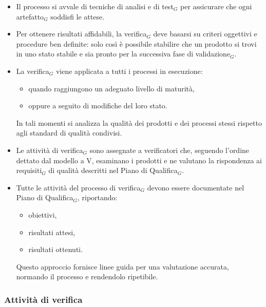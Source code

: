 \documentclass[a4paper, 10pt]{article}
\begin{document}
\begin{itemize}
    \item Il processo si avvale di tecniche di analisi e di test$_G$ per assicurare che ogni artefatto$_G$ soddisfi le attese.
    \item Per ottenere risultati affidabili, la verifica$_G$ deve basarsi su criteri oggettivi e procedure ben definite: solo così è possibile stabilire che un prodotto si trovi in uno stato stabile e sia pronto per la successiva fase di validazione$_G$.
    \item La verifica$_G$ viene applicata a tutti i processi in esecuzione:
    \begin{itemize}
        \item quando raggiungono un adeguato livello di maturità,
        \item oppure a seguito di modifiche del loro stato.
    \end{itemize}
    In tali momenti si analizza la qualità dei prodotti e dei processi stessi rispetto agli standard di qualità condivisi.
    \item Le attività di verifica$_G$ sono assegnate a verificatori che, seguendo l'ordine dettato dal modello a V, esaminano i prodotti e ne valutano la rispondenza ai requisiti$_G$ di qualità descritti nel Piano di Qualifica$_G$.
    \item Tutte le attività del processo di verifica$_G$ devono essere documentate nel Piano di Qualifica$_G$, riportando:
    \begin{itemize}
        \item obiettivi,
        \item risultati attesi,
        \item risultati ottenuti.
    \end{itemize}
    Questo approccio fornisce linee guida per una valutazione accurata, normando il processo e rendendolo ripetibile.
\end{itemize}

\subsubsection{Attività di verifica}
\label{subsec:attivita_verifica}
\end{document}
